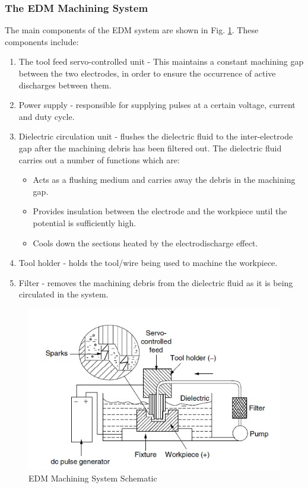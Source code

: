 \subsubsection{The EDM Machining System}
The main components of the EDM system are shown in Fig. \ref{fig:edm}. These components include:
\begin{enumerate}
	\item The tool feed servo-controlled unit - This maintains a constant machining gap between the two electrodes, in order to ensure the occurrence of active discharges between them.
	\item Power supply - responsible for  supplying pulses at a certain voltage, current and duty cycle.
	\item Dielectric circulation unit - flushes the dielectric fluid to the inter-electrode gap after the machining debris has been filtered out. The dielectric fluid carries out a number of functions which are:
	\begin{itemize}
		\item Acts as a flushing medium and carries away the debris in the machining gap.
		\item Provides insulation between the electrode and the workpiece until the potential is sufficiently high.
		\item Cools down the sections heated by the electrodischarge effect.
	\end{itemize}
	\item Tool holder - holds the tool/wire being used to machine the workpiece.
	\item Filter - removes the machining debris from the dielectric fluid as it is being circulated in the system.
\end{enumerate}
\begin{figure}[h!]
	\centering
	\includegraphics[width=0.7\linewidth]{Figures/edm}
	\caption[EDM Machining System]{EDM Machining System Schematic\cite{classnotes}}
	\label{fig:edm}
\end{figure}
